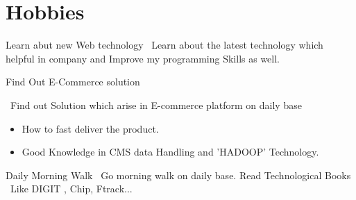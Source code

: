 \documentclass[]{cv-style}          %
\begin{document}


\section{Hobbies}
  \vspace{-0.2cm}

\begin{entrylist}

\entry
  {}
  {Learn abut new Web technology }
  {}
  {\jobtitle{}\ Learn about the latest technology which helpful in company and Improve my
     programming Skills as well.}
  
  \entry
  {}
  {Find Out E-Commerce solution }
  {}
  {\jobtitle{}\ Find out Solution which arise in E-commerce platform on daily base 
  \begin{itemize}
    \item How to fast deliver the product. 
    \item Good Knowledge in CMS data Handling and 'HADOOP' Technology.
     
     
  \end{itemize}}
  \entry
  {}
  {Daily Morning Walk }
  {}
  {\jobtitle{}\ Go morning walk on daily base. }
  \entry
  {}
  {Read Technological Books }
  {}
  {\jobtitle{}\ Like DIGIT , Chip, Ftrack... }
  

\end{entrylist}
\end{document}
